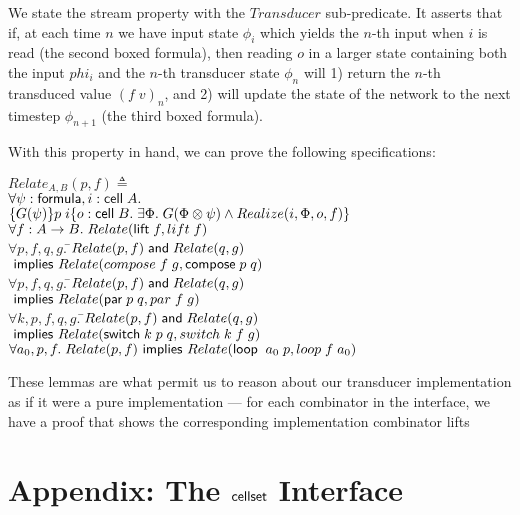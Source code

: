 \documentclass[preprint,natbib]{sigplanconf}
\begin{document}
We state the stream property with the $Transducer$ sub-predicate. It
asserts that if, at each time $n$ we have input state $\phi_i$ which
yields the $n$-th input when $i$ is read (the second boxed formula), then 
reading $o$ in a larger state containing both the input $phi_i$ and the
$n$-th transducer state $\phi_n$ will 1) return the $n$-th transduced
value $(f\;v)_n$, and 2) will update the state of the network to 
the next timestep $\phi_{n+1}$ (the third boxed formula). 

With this property in hand, we can prove the following specifications: 

\begin{tabbing}
$Relate_{A,B}(p, f) \triangleq$ \\
\;\; $\forall \psi:\mbox{\textsf{{formula}}}, i:\mbox{\textsf{{cell}}}\;{A}.$ \\ 
\qquad $\{{G(\psi)}\}{p\;i}\{{o:\mbox{\textsf{{cell}}}\;{B}}.\;{\exists \Phi.\;G(\Phi \otimes \psi) \land Realize(i, \Phi, o, f)}\}$ \\[1em]

$\forall f:A\to B.\; Relate(\mbox{\textsf{{lift}}}\; f, lift\;f)$ \\[1em]

$\forall p, f, q, g.\;$\=$Relate(p, f) \;\mbox{\textsf{{and}}}\; Relate(q, g)$ \\
                       \>$\mbox{\textsf{{ implies }}} Relate(compose\;f\;g, \mbox{\textsf{{compose}}}\; p\;q)$ \\[1em]

$\forall p, f, q, g.\;$\=$Relate(p, f) \;\mbox{\textsf{{and}}}\; Relate(q, g)$ \\
                       \>$\mbox{\textsf{{ implies }}} Relate(\mbox{\textsf{{par}}}\; p\;q, par\;f\;g)$ \\[1em]

$\forall k, p, f, q, g.\;$\=$Relate(p, f) \;\mbox{\textsf{{and}}}\; Relate(q, g)$ \\
                          \>$\mbox{\textsf{{ implies }}} Relate(\mbox{\textsf{{switch}}}\; k\;p\;q, switch\;k\;f\;g)$ \\[1em]

$\forall a_0, p, f.\; 
  Relate(p, f) \mbox{\textsf{{ implies }}} Relate(\mbox{\textsf{{loop}}}\;\;a_0\;p, loop\;f\;a_0)$
\end{tabbing}

These lemmas are what permit us to reason about our transducer
implementation as if it were a pure implementation --- for each
combinator in the interface, we have a proof that shows the
corresponding implementation combinator lifts


\appendix

\section{Appendix: The $\mbox{\textsf{{cellset}}}$ Interface}
\end{document}
